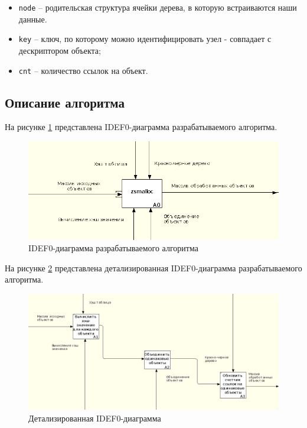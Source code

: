 
\begin{itemize}
	\item \texttt{node} -- родительская структура ячейки дерева, в которую встраиваются наши данные.
	\item \texttt{key} -- ключ, по которому можно идентифицировать узел - совпадает с дескриптором объекта;
	\item \texttt{cnt} -- количество ссылок на объект.
\end{itemize}

\subsection{Описание алгоритма}

На рисунке \ref{fig:idef0-0} представлена IDEF0-диаграмма разрабатываемого алгоритма.

\begin{figure}[h]
	\centering
	\includegraphics[width=\textwidth]{img/idef0-0.png}
	\caption{IDEF0-диаграмма разрабатываемого алгоритма}
	\label{fig:idef0-0}
\end{figure}

На рисунке \ref{fig:idef0-1} представлена детализированная IDEF0-диаграмма разрабатываемого алгоритма.

\begin{figure}[h]
	\centering
	\includegraphics[width=\textwidth]{img/idef0-1.png}
	\caption{Детализированная IDEF0-диаграмма}
	\label{fig:idef0-1}
\end{figure}

